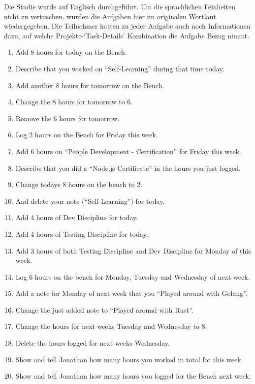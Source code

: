 \documentclass[oneside,bibliography=totocnumbered,BCOR=5mm]{scrbook}
\begin{document}
Die Studie wurde auf Englisch durchgeführt. Um die sprachlichen Feinheiten nicht
zu vertuschen, wurden die Aufgaben hier im originalen Wortlaut wiedergegeben.
Die Teilnehmer hatten zu jeder Aufgabe auch noch Informationen dazu, auf welche
Projekte-`Task-Details' Kombination die Aufgabe Bezug nimmt.

\begin{enumerate}
  \item Add 8 hours for today on the Bench.
  \item Describe that you worked on ``Self-Learning'' during that time today.
  \item Add another 8 hours for tomorrow on the Bench.
  \item Change the 8 hours for tomorrow to 6.
  \item Remove the 6 hours for tomorrow.
  \item Log 2 hours on the Bench for Friday this week.
  \item Add 6 hours on ``People Development - Certification'' for Friday this week.
  \item Describe that you did a ``Node.js Certificate'' in the hours you just logged.
  \item Change todays 8 hours on the bench to 2.
  \item And delete your note (``Self-Learning'') for today.
  \item Add 4 hours of Dev Discipline for today.
  \item Add 4 hours of Testing Discipline for today.
  \item Add 3 hours of both Testing Discipline and Dev Discipline for Monday of this week.
  \item Log 6 hours on the bench for Monday, Tuesday and Wednesday of next week.
  \item Add a note for Monday of next week that you ``Played around with Golang''.
  \item Change the just added note to ``Played around with Rust''.
  \item Change the hours for next weeks Tuesday and Wednesday to 8.
  \item Delete the hours logged for next weeks Wednesday.
  \item Show and tell Jonathan how many hours you worked in total for this week.
  \item Show and tell Jonathan how many hours you logged for the Bench next week.
\end{enumerate}
\end{document}
